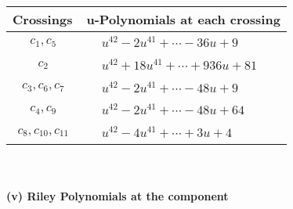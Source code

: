 \documentclass[1p]{elsarticle_modified}
\theoremstyle{definition}
\begin{document}
\begin{tabular}{m{50pt}|m{274pt}}
Crossings & \hspace{64pt}u-Polynomials at each crossing \\
\hline $$\begin{aligned}c_{1},c_{5}\end{aligned}$$&$\begin{aligned}
&u^{42}-2 u^{41}+\cdots-36 u+9
\end{aligned}$\\
\hline $$\begin{aligned}c_{2}\end{aligned}$$&$\begin{aligned}
&u^{42}+18 u^{41}+\cdots+936 u+81
\end{aligned}$\\
\hline $$\begin{aligned}c_{3},c_{6},c_{7}\end{aligned}$$&$\begin{aligned}
&u^{42}-2 u^{41}+\cdots-48 u+9
\end{aligned}$\\
\hline $$\begin{aligned}c_{4},c_{9}\end{aligned}$$&$\begin{aligned}
&u^{42}-2 u^{41}+\cdots-48 u+64
\end{aligned}$\\
\hline $$\begin{aligned}c_{8},c_{10},c_{11}\end{aligned}$$&$\begin{aligned}
&u^{42}-4 u^{41}+\cdots+3 u+4
\end{aligned}$\\
\hline
\end{tabular}\\~\\
\newpage\renewcommand{\arraystretch}{1}
\flushleft \textbf{(v) Riley Polynomials at the component}\newline \\
\end{document}
